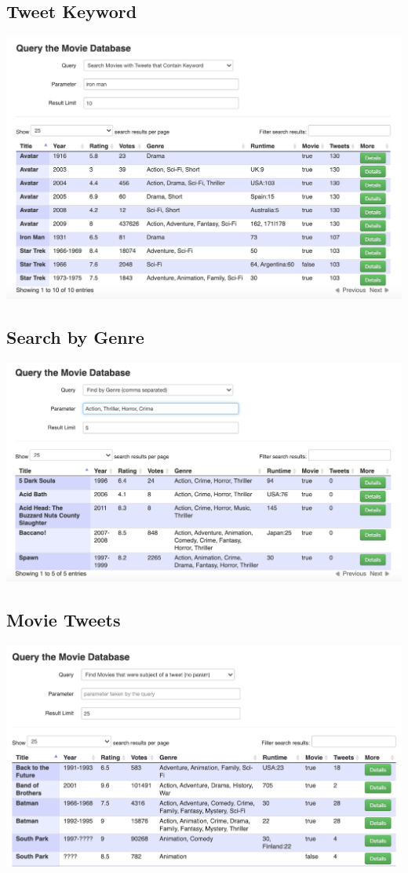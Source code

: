 \documentclass[ngerman]{dis-template-add}
\begin{document}
\subsection*{Tweet Keyword}
\includegraphics[scale=0.3]{6-tweet_keyword.png}

\subsection*{Search by Genre}
\includegraphics[scale=0.3]{7-genre.png}

\subsection*{Movie Tweets}
\includegraphics[scale=0.3]{8-movie_tweet.png}
\end{document}
